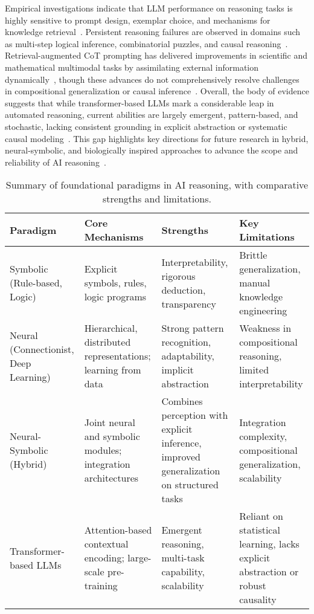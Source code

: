 \documentclass[sigconf]{acmart}
\begin{document}
Empirical investigations indicate that LLM performance on reasoning tasks is highly sensitive to prompt design, exemplar choice, and mechanisms for knowledge retrieval~\cite{ref1,ref5,ref10,ref19,ref11}. Persistent reasoning failures are observed in domains such as multi-step logical inference, combinatorial puzzles, and causal reasoning~\cite{ref1,ref10,ref19}. Retrieval-augmented CoT prompting has delivered improvements in scientific and mathematical multimodal tasks by assimilating external information dynamically~\cite{ref5,ref11,ref42}, though these advances do not comprehensively resolve challenges in compositional generalization or causal inference~\cite{ref43,ref44,ref70,ref86}. Overall, the body of evidence suggests that while transformer-based LLMs mark a considerable leap in automated reasoning, current abilities are largely emergent, pattern-based, and stochastic, lacking consistent grounding in explicit abstraction or systematic causal modeling~\cite{ref10,ref11,ref43,ref44}. This gap highlights key directions for future research in hybrid, neural-symbolic, and biologically inspired approaches to advance the scope and reliability of AI reasoning~\cite{ref42,ref49,ref86}.

\begin{table*}[htbp]
\centering
\caption{Summary of foundational paradigms in AI reasoning, with comparative strengths and limitations.}
\label{tab:paradigm_comparison}
\begin{adjustbox}{max width=\textwidth}
\begin{tabular}{@{}llll@{}}
\toprule
\textbf{Paradigm} & \textbf{Core Mechanisms} & \textbf{Strengths} & \textbf{Key Limitations} \\
\midrule
Symbolic (Rule-based, Logic) & Explicit symbols, rules, logic programs & Interpretability, rigorous deduction, transparency & Brittle generalization, manual knowledge engineering \\
Neural (Connectionist, Deep Learning) & Hierarchical, distributed representations; learning from data & Strong pattern recognition, adaptability, implicit abstraction & Weakness in compositional reasoning, limited interpretability \\
Neural-Symbolic (Hybrid) & Joint neural and symbolic modules; integration architectures & Combines perception with explicit inference, improved generalization on structured tasks & Integration complexity, compositional generalization, scalability \\
Transformer-based LLMs & Attention-based contextual encoding; large-scale pre-training & Emergent reasoning, multi-task capability, scalability & Reliant on statistical learning, lacks explicit abstraction or robust causality \\
\bottomrule
\end{tabular}
\end{adjustbox}
\end{table*}
\end{document}
